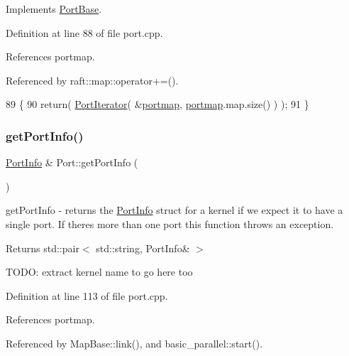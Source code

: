 Implements \hyperlink{class_port_base_a50427e7a1beea0d5111ccc81ee418178}{Port\+Base}.



Definition at line 88 of file port.\+cpp.



References portmap.



Referenced by raft\+::map\+::operator+=().


\begin{DoxyCode}
89 \{
90    \textcolor{keywordflow}{return}( \hyperlink{class_port_iterator}{PortIterator}( &\hyperlink{class_port_a537a8a0c2a47acbf8654f286200aee90}{portmap}, \hyperlink{class_port_a537a8a0c2a47acbf8654f286200aee90}{portmap}.map.size() ) );
91 \}
\end{DoxyCode}
\hypertarget{class_port_a4af1cb062940ca3b83c569f024b9a8d1}{}\label{class_port_a4af1cb062940ca3b83c569f024b9a8d1} 
\subsubsection{\texorpdfstring{get\+Port\+Info()}{getPortInfo()}}
{\footnotesize\ttfamily \hyperlink{struct_port_info}{Port\+Info} \& Port\+::get\+Port\+Info (\begin{DoxyParamCaption}{ }\end{DoxyParamCaption})\hspace{0.3cm}{\ttfamily [protected]}}

get\+Port\+Info -\/ returns the \hyperlink{struct_port_info}{Port\+Info} struct for a kernel if we expect it to have a single port. If there\textquotesingle{}s more than one port this function throws an exception. \begin{DoxyReturn}{Returns}
std\+::pair$<$ std\+::string, Port\+Info\& $>$ 
\end{DoxyReturn}
T\+O\+DO\+: extract kernel name to go here too 

Definition at line 113 of file port.\+cpp.



References portmap.



Referenced by Map\+Base\+::link(), and basic\+\_\+parallel\+::start().


